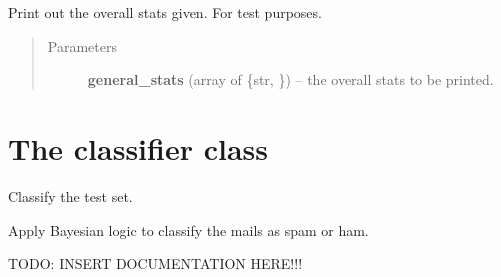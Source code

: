 \documentclass[letterpaper,10pt,english]{sphinxmanual}
\begin{document}
\begin{fulllineitems}
\begin{fulllineitems}
\begin{quote}
\begin{description}
\begin{itemize}
\end{itemize}

\end{description}\end{quote}

\end{fulllineitems}


\begin{fulllineitems}
\label{index:trainer.Trainer.trainer_print}
Print out the overall stats given. For test purposes.
\begin{quote}\begin{description}
\item[{Parameters}] \leavevmode
\textbf{general\_stats} (array of \{str, {\hyperref[index:gen_stat.Stat]{}}\}) -- the overall stats to be printed.

\end{description}\end{quote}

\end{fulllineitems}


\end{fulllineitems}



\section{The classifier class}
\label{index:the-classifier-class}\label{index:module-classifier}

\begin{fulllineitems}
\label{index:classifier.Classifier}
Classify the test set.

Apply Bayesian logic to classify the mails as spam or ham.

\begin{fulllineitems}
\label{index:classifier.Classifier.classify}
TODO: INSERT DOCUMENTATION HERE!!!

\end{fulllineitems}


\end{fulllineitems}
\end{document}

